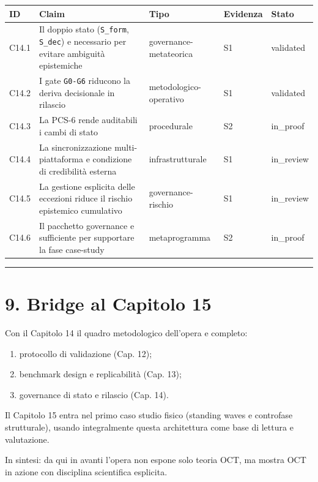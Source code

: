 {\def\LTcaptype{none} %
\begin{longtable}[]{@{}lllll@{}}
\toprule\noalign{}
ID & Claim & Tipo & Evidenza & Stato \\
\midrule\noalign{}
\endhead
\bottomrule\noalign{}
\endlastfoot
C14.1 & Il doppio stato (\texttt{S\_form}, \texttt{S\_dec}) e necessario per evitare ambiguità epistemiche & governance-metateorica & S1 & validated \\
C14.2 & I gate \texttt{G0-G6} riducono la deriva decisionale in rilascio & metodologico-operativo & S1 & validated \\
C14.3 & La PCS-6 rende auditabili i cambi di stato & procedurale & S2 & in\_proof \\
C14.4 & La sincronizzazione multi-piattaforma e condizione di credibilità esterna & infrastrutturale & S1 & in\_review \\
C14.5 & La gestione esplicita delle eccezioni riduce il rischio epistemico cumulativo & governance-rischio & S1 & in\_review \\
C14.6 & Il pacchetto governance e sufficiente per supportare la fase case-study & metaprogramma & S2 & in\_proof \\
\end{longtable}
}

\begin{center}\rule{0.5\linewidth}{0.5pt}\end{center}

\section{9. Bridge al Capitolo 15}

Con il Capitolo 14 il quadro metodologico dell'opera e completo:

\begin{enumerate}
\def\labelenumi{\arabic{enumi}.}
\tightlist
\item
  protocollo di validazione (Cap. 12);
\item
  benchmark design e replicabilità (Cap. 13);
\item
  governance di stato e rilascio (Cap. 14).
\end{enumerate}

Il Capitolo 15 entra nel primo caso studio fisico (standing waves e controfase strutturale), usando integralmente questa architettura come base di lettura e valutazione.

In sintesi: da qui in avanti l'opera non espone solo teoria OCT, ma mostra OCT in azione con disciplina scientifica esplicita.

